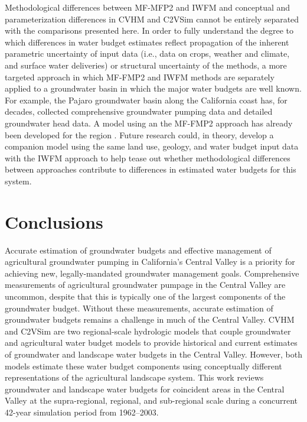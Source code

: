 Methodological differences between MF-MFP2 and IWFM and conceptual and parameterization differences in CVHM and C2VSim cannot be entirely separated with the comparisons presented here. In order to fully understand the degree to which differences in water budget estimates reflect propagation of the inherent parametric uncertainty of input data (i.e., data on crops, weather and climate, and surface water deliveries) or structural uncertainty of the methods, a more targeted approach in which MF-FMP2 and IWFM methods are separately applied to a groundwater basin in which the major water budgets are well known. For example, the Pajaro groundwater basin along the California coast has, for decades, collected comprehensive groundwater pumping data and detailed groundwater head data. A model using an the MF-FMP2 approach has already been developed for the region \citep{hanson2012method}. Future research could, in theory, develop a companion model using the same land use, geology, and water budget input data with the IWFM approach to help tease out whether methodological differences between approaches contribute to differences in estimated water budgets for this system.

\section{Conclusions}

Accurate estimation of groundwater budgets and effective management of agricultural groundwater pumping in California’s Central Valley is a priority for achieving new, legally-mandated groundwater management goals. Comprehensive measurements of agricultural groundwater pumpage in the Central Valley are uncommon, despite that this is typically one of the largest components of the groundwater budget. Without these measurements, accurate estimation of groundwater budgets remains a challenge in much of the Central Valley. CVHM and C2VSim are two regional-scale hydrologic models that couple groundwater and agricultural water budget models to provide historical and current estimates of groundwater and landscape water budgets in the Central Valley. However, both models estimate these water budget components using conceptually different representations of the agricultural landscape system. This work reviews groundwater and landscape water budgets for coincident areas in the Central Valley at the supra-regional, regional, and sub-regional scale during a concurrent 42-year simulation period from 1962--2003. 

